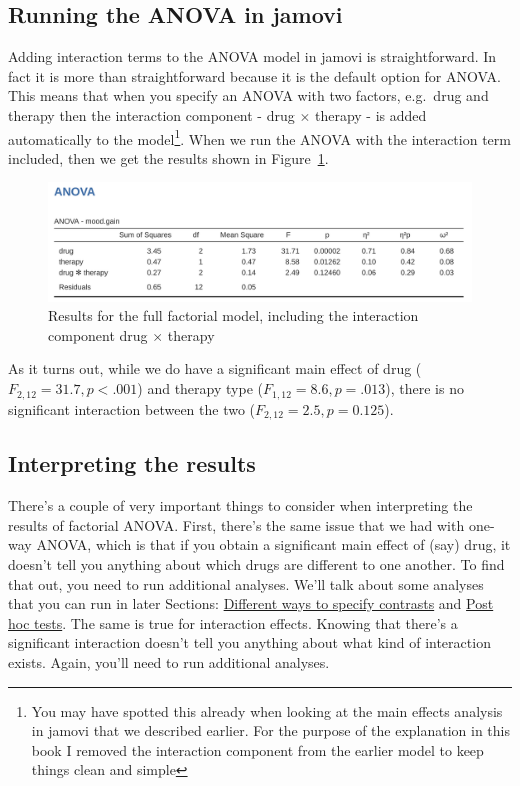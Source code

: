 \documentclass[
  a4paper,
]{book}
\begin{document}
\hypertarget{running-the-anova-in-jamovi}{%
\subsection{Running the ANOVA in
jamovi}\label{running-the-anova-in-jamovi}}

Adding interaction terms to the ANOVA model in jamovi is
straightforward. In fact it is more than straightforward because it is
the default option for ANOVA. This means that when you specify an ANOVA
with two factors, e.g.~drug and therapy then the interaction component -
drug \(\times\) therapy - is added automatically to the
model\footnote{You may have spotted this already when looking at the
  main effects analysis in jamovi that we described earlier. For the
  purpose of the explanation in this book I removed the interaction
  component from the earlier model to keep things clean and simple}.
When we run the ANOVA with the interaction term included, then we get
the results shown in Figure~\ref{fig-fig14-7}.

\begin{figure}

\includegraphics[width=1\textwidth,height=\textheight]{images/fig14-7.png} \hfill{}

\caption{\label{fig-fig14-7}Results for the full factorial model,
including the interaction component drug \(\times\) therapy}

\end{figure}

As it turns out, while we do have a significant main effect of drug
(\(F_{2,12} = 31.7, p < .001\)) and therapy type
(\(F_{1,12} = 8.6, p = .013\)), there is no significant interaction
between the two (\(F_{2,12} = 2.5, p = 0.125\)).

\hypertarget{interpreting-the-results}{%
\subsection{Interpreting the results}\label{interpreting-the-results}}

There's a couple of very important things to consider when interpreting
the results of factorial ANOVA. First, there's the same issue that we
had with one-way ANOVA, which is that if you obtain a significant main
effect of (say) drug, it doesn't tell you anything about which drugs are
different to one another. To find that out, you need to run additional
analyses. We'll talk about some analyses that you can run in later
Sections:
\protect\hyperlink{different-ways-to-specify-contrasts}{Different ways
to specify contrasts} and \protect\hyperlink{sec-Post-hoc-tests}{Post
hoc tests}. The same is true for interaction effects. Knowing that
there's a significant interaction doesn't tell you anything about what
kind of interaction exists. Again, you'll need to run additional
analyses.
\end{document}
